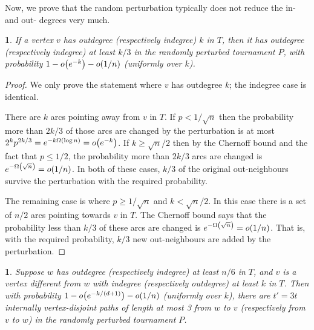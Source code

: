 \documentclass[11pt,english]{article}
\theoremstyle{plain}
\theoremstyle{definition}
\theoremstyle{definition}
\theoremstyle{plain}
\theoremstyle{plain}
\theoremstyle{plain}
\newtheorem{lem}[thm]{\protect\lemmaname}
\theoremstyle{plain}
\theoremstyle{remark}
\theoremstyle{remark}
\let\originalleft\left
\let\originalright\right
\renewcommand{\left}{\mathopen{}\mathclose\bgroup\originalleft}
\renewcommand{\right}{\aftergroup\egroup\originalright}
\providecommand{\lemmaname}{Lemma}
\begin{document}
Now, we prove that the random perturbation typically does not reduce
the in- and out- degrees very much. 
\begin{lem}
\label{lem:preserve-degree}If a vertex $v$ has outdegree (respectively
indegree) $k$ in $T$, then it has outdegree (respectively indegree)
at least $k/3$ in the randomly perturbed tournament $P$, with probability $1-o\left(e^{-k}\right)-o\left(1/n\right)$
(uniformly over $k$).\end{lem}
\begin{proof}
We only prove the statement where $v$ has outdegree $k$; the indegree
case is identical.

There are $k$ arcs pointing away from $v$ in $T$. If $p<1/\sqrt{n}$ then the probability more than  $2k/3$ of those arcs are changed by the perturbation is at most $2^kp^{2k/3}=e^{-k\Omega\left(\log n\right)}=o\left(e^{-k}\right)$. If $k\ge\sqrt{n}/2$ then by the Chernoff bound and the fact that $p\le1/2$, the probability more than $2k/3$ arcs are changed is $e^{-\Omega\left(\sqrt{n}\right)}=o\left(1/n\right)$. In both of these cases, $k/3$ of the original out-neighbours survive
the perturbation with the required probability.

The remaining case is where $p\ge1/\sqrt{n}$ and $k<\sqrt{n}/2$.
In this case there is a set of $n/2$ arcs pointing towards $v$ in
$T$. The Chernoff bound says that the probability less than $k/3$
of these arcs are changed is $e^{-\Omega\left(\sqrt{n}\right)}=o\left(1/n\right)$.
That is, with the required probability, $k/3$ new out-neighbours
are added by the perturbation.\end{proof}
\begin{lem}
\label{lem:path-from-home}Suppose $w$ has outdegree (respectively
indegree) at least $n/6$ in $T$, and $v$ is a vertex different
from $w$ with indegree (respectively outdegree) at least $k$ in
$T$. Then with probability $1-o\left(e^{-k/\left(d+1\right)}\right)-o\left(1/n\right)$
(uniformly over $k$), there are $t'=3t$ internally vertex-disjoint
paths of length at most 3 from $w$ to $v$ (respectively from $v$
to $w$) in the randomly perturbed tournament $P$.\end{lem}
\end{document}
